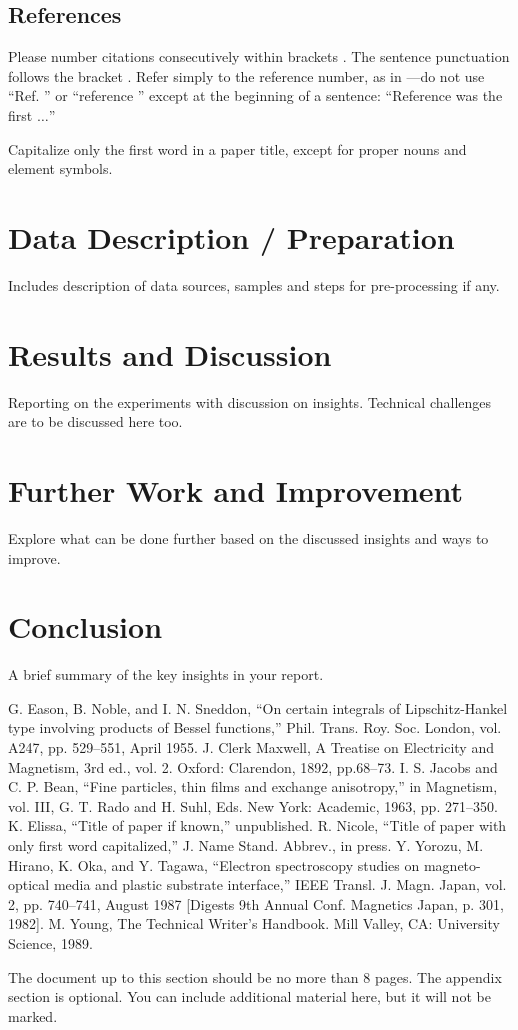 \documentclass[conference]{IEEEtran}
\begin{document}
\subsection{References}

Please number citations consecutively within brackets \cite{b1}. The
sentence punctuation follows the bracket \cite{b2}. Refer simply to the reference
number, as in \cite{b3}---do not use ``Ref. \cite{b3}'' or ``reference \cite{b3}'' except at
the beginning of a sentence: ``Reference \cite{b3} was the first $\ldots$''

Capitalize only the first word in a paper title, except for proper nouns and
element symbols.

\section{Data Description / Preparation}
{\color{blue}Includes description of data sources, samples and steps for pre-processing if any.}

\section{Results and Discussion}
{\color{blue}Reporting on the experiments with discussion on insights. Technical challenges are to be discussed here too.}

\section{Further Work and Improvement}
{\color{blue}Explore what can be done further based on the discussed insights and ways to improve.}


\section{Conclusion}
{\color{blue}A brief summary of the key insights in your report.}

\begin{thebibliography}{00}
 G. Eason, B. Noble, and I. N. Sneddon, ``On certain integrals of Lipschitz-Hankel type involving products of Bessel functions,'' Phil. Trans. Roy. Soc. London, vol. A247, pp. 529--551, April 1955.
 J. Clerk Maxwell, A Treatise on Electricity and Magnetism, 3rd ed., vol. 2. Oxford: Clarendon, 1892, pp.68--73.
 I. S. Jacobs and C. P. Bean, ``Fine particles, thin films and exchange anisotropy,'' in Magnetism, vol. III, G. T. Rado and H. Suhl, Eds. New York: Academic, 1963, pp. 271--350.
 K. Elissa, ``Title of paper if known,'' unpublished.
 R. Nicole, ``Title of paper with only first word capitalized,'' J. Name Stand. Abbrev., in press.
 Y. Yorozu, M. Hirano, K. Oka, and Y. Tagawa, ``Electron spectroscopy studies on magneto-optical media and plastic substrate interface,'' IEEE Transl. J. Magn. Japan, vol. 2, pp. 740--741, August 1987 [Digests 9th Annual Conf. Magnetics Japan, p. 301, 1982].
 M. Young, The Technical Writer's Handbook. Mill Valley, CA: University Science, 1989.
\end{thebibliography}

\appendix
{\color{blue}The document up to this section should be no more than 8 pages. The appendix section is optional. You can include additional material here, but it will not be marked.}
\end{document}
